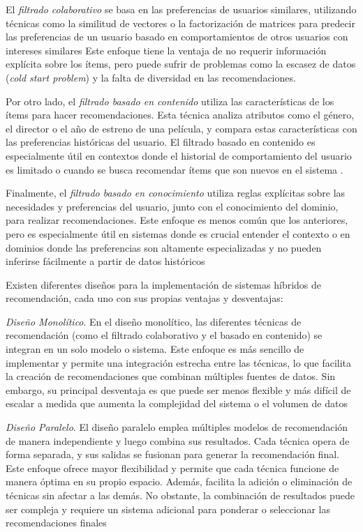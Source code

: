 \documentclass{llncs}
\begin{document}
	El \textit{filtrado colaborativo} se basa en las preferencias de usuarios similares, utilizando técnicas como la similitud de vectores o la factorización de matrices para predecir las preferencias de un usuario basado en comportamientos de otros usuarios con intereses similares \cite{jannach2010recommender} Este enfoque tiene la ventaja de no requerir información explícita sobre los ítems, pero puede sufrir de problemas como la escasez de datos (\textit{cold start problem}) y la falta de diversidad en las recomendaciones.
	
	Por otro lado, el \textit{filtrado basado en contenido} utiliza las características de los ítems para hacer recomendaciones. Esta técnica analiza atributos como el género, el director o el año de estreno de una película, y compara estas características con las preferencias históricas del usuario. El filtrado basado en contenido es especialmente útil en contextos donde el historial de comportamiento del usuario es limitado o cuando se busca recomendar ítems que son nuevos en el sistema \cite{jannach2010recommender}.
	
	Finalmente, el \textit{filtrado basado en conocimiento} utiliza reglas explícitas sobre las necesidades y preferencias del usuario, junto con el conocimiento del dominio, para realizar recomendaciones. Este enfoque es menos común que los anteriores, pero es especialmente útil en sistemas donde es crucial entender el contexto o en dominios donde las preferencias son altamente especializadas y no pueden inferirse fácilmente a partir de datos históricos \cite{burke2002hybrid}
	
	Existen diferentes diseños para la implementación de sistemas híbridos de recomendación, cada uno con sus propias ventajas y desventajas:
	
	\textit{Diseño Monolítico}.
	En el diseño monolítico, las diferentes técnicas de recomendación (como el filtrado colaborativo y el basado en contenido) se integran en un solo modelo o sistema. Este enfoque es más sencillo de implementar y permite una integración estrecha entre las técnicas, lo que facilita la creación de recomendaciones que combinan múltiples fuentes de datos. Sin embargo, su principal desventaja es que puede ser menos flexible y más difícil de escalar a medida que aumenta la complejidad del sistema o el volumen de datos \cite{burke2002hybrid}
	
	\textit{Diseño Paralelo}.
	El diseño paralelo emplea múltiples modelos de recomendación de manera independiente y luego combina sus resultados. Cada técnica opera de forma separada, y sus salidas se fusionan para generar la recomendación final. Este enfoque ofrece mayor flexibilidad y permite que cada técnica funcione de manera óptima en su propio espacio. Además, facilita la adición o eliminación de técnicas sin afectar a las demás. No obstante, la combinación de resultados puede ser compleja y requiere un sistema adicional para ponderar o seleccionar las recomendaciones finales \cite{burke2002hybrid}
	
\end{document}
